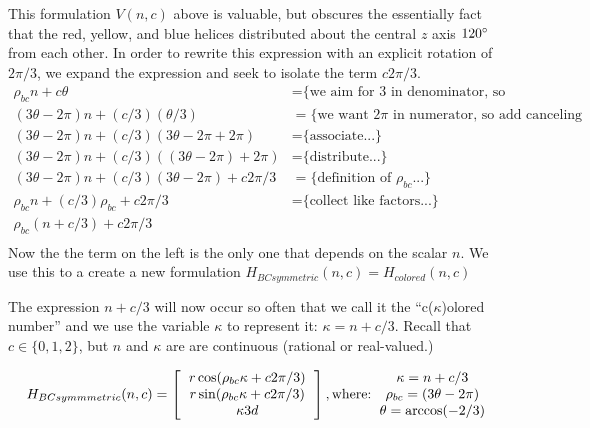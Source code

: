 \documentclass[11pt]{article}
\begin{document}
This formulation $V(n,c)$ above is valuable, but obscures the essentially fact that the red, yellow, and blue helices distributed
about the central $z$ axis $120\degree$ from each other.
In order to rewrite this expression with an explicit rotation of $2\pi/3$, we expand 
the expression and seek to isolate the term $c2\pi/3$.
\begin{align*}
  \rho_{bc} n + c \theta  &=   \text{\{we aim for 3 in denominator, so we split...\}} \\
    (3 \theta - 2 \pi)n + (c/3)  (\theta /3)  &=   \text{\{we want $2\pi$ in numerator, so add canceling terms...\}} \\
  (3 \theta - 2 \pi)n + (c/ 3) (3 \theta - 2 \pi  + 2 \pi) &=  \text{\{associate...\}} \\
  (3 \theta - 2 \pi)n + (c/ 3) ((3 \theta - 2 \pi)  + 2 \pi) &=  \text{\{distribute...\}} \\  
  (3 \theta - 2 \pi)n + (c / 3) (3 \theta - 2 \pi)  + c 2 \pi /3 &=  \text{\{definition of $\rho_{bc}$...\}} \\
  \rho_{bc} n + (c / 3) \rho_{bc}  + c 2 \pi /3 &=  \text{\{collect like factors...\}} \\  
  \rho_{bc} (n + c/3)  + c 2 \pi /3  \\
\end{align*}
Now the the term on the left is the only one that depends on the scalar $n$. We use this to a create
a new formulation $H_{BCsymmetric}(n,c) = H_{colored}(n,c)$

The expression $n+c/3$ will now occur so often that we call it the ``c($\kappa$)olored number'' and we use the variable $\kappa$ to represent it: $\kappa = n+c/3$.
Recall that $c \in \{0,1,2\}$, but $n$ and $\kappa$ are are continuous (rational or real-valued.)

\[
H_{BCsymmmetric}(n,c) =
\left [
  \begin{tabular}{c}
   $ r  \cos(\rho_{bc} \kappa  + c 2 \pi /3) $\\
   $ r  \sin(\rho_{bc} \kappa  + c 2 \pi /3) $\\
   $ \kappa 3  d $
  \end{tabular}
  \right ],
\text{where:}
  \begin{tabular}{c}
 $\kappa = n + c/3$ \\
    $\rho_{bc} = (3 \theta - 2 \pi)$ \\
   $ \theta = \arccos(-2/3) $
  \end{tabular}      
\]
\end{document}
